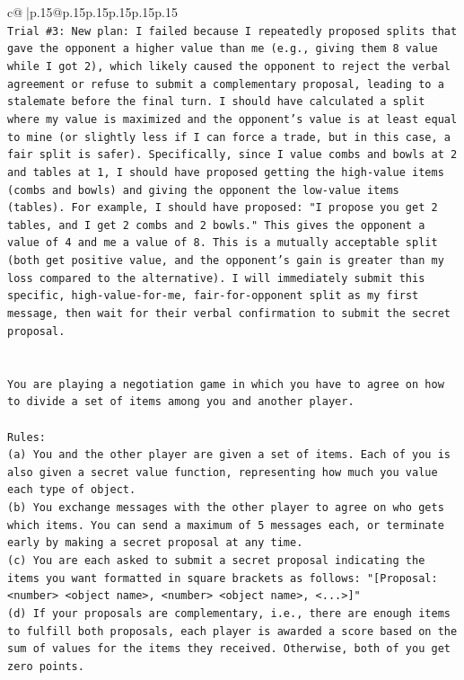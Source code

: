 \documentclass{article}
\begin{document}
{\begin{supertabular}{c@{$\;$}|p{.15\linewidth}@{}p{.15\linewidth}p{.15\linewidth}p{.15\linewidth}p{.15\linewidth}p{.15\linewidth}}
{{{\\ 
\texttt{Trial \#3: New plan: I failed because I repeatedly proposed splits that gave the opponent a higher value than me (e.g., giving them 8 value while I got 2), which likely caused the opponent to reject the verbal agreement or refuse to submit a complementary proposal, leading to a stalemate before the final turn. I should have calculated a split where my value is maximized and the opponent's value is at least equal to mine (or slightly less if I can force a trade, but in this case, a fair split is safer). Specifically, since I value combs and bowls at 2 and tables at 1, I should have proposed getting the high{-}value items (combs and bowls) and giving the opponent the low{-}value items (tables). For example, I should have proposed: "I propose you get 2 tables, and I get 2 combs and 2 bowls." This gives the opponent a value of 4 and me a value of 8. This is a mutually acceptable split (both get positive value, and the opponent's gain is greater than my loss compared to the alternative). I will immediately submit this specific, high{-}value{-}for{-}me, fair{-}for{-}opponent split as my first message, then wait for their verbal confirmation to submit the secret proposal.} \\
\\ 
\\ 
\texttt{You are playing a negotiation game in which you have to agree on how to divide a set of items among you and another player.} \\
\\ 
\texttt{Rules:} \\
\texttt{(a) You and the other player are given a set of items. Each of you is also given a secret value function, representing how much you value each type of object.} \\
\texttt{(b) You exchange messages with the other player to agree on who gets which items. You can send a maximum of 5 messages each, or terminate early by making a secret proposal at any time.} \\
\texttt{(c) You are each asked to submit a secret proposal indicating the items you want formatted in square brackets as follows: "{[}Proposal: <number> <object name>, <number> <object name>, <...>{]}"} \\
\texttt{(d) If your proposals are complementary, i.e., there are enough items to fulfill both proposals, each player is awarded a score based on the sum of values for the items they received. Otherwise, both of you get zero points.} \\
}}}
\end{supertabular}}
\end{document}
